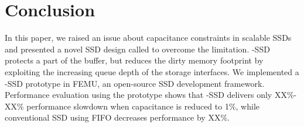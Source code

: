 \section{Conclusion}

In this paper, we raised an issue about capacitance constraints in scalable
SSDs and presented a novel SSD design called \ours{} to overcome the
limitation.  \ours{}-SSD protects a part of the buffer, but reduces the dirty
memory footprint by exploiting the increasing queue depth of the storage
interfaces. We implemented a \ours{}-SSD prototype in FEMU, an open-source SSD
development framework. Performance evaluation using the prototype shows that \ours{}-SSD 
delivers only XX\%-XX\% performance slowdown when capacitance is reduced to 1\%, 
while conventional SSD using FIFO decreases performance by XX\%.

\iffalse
Hexa's design, implementation, and evaluation to
reduce performance overhead due to metadata flush in a situation where PLP is
partially supported on enterprise-class SSDs.  Our desing operates using only a
small amount of Capacitor's capacity compared to the previous one. It also
minimizes the impact of metadata by buffering requests using the scalability of
the write buffer.  Our evaluation results show that Hexa improves performance
in situations where requests are randomly generated.  In addition, JESD and
real-benchmark results comfirm that there are advantages in a real-world
environment.
\fi
